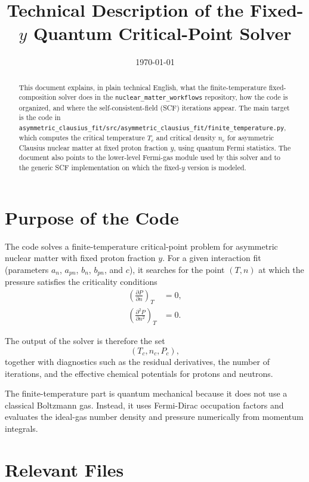 \documentclass[11pt]{article}
\title{Technical Description of the Fixed-\texorpdfstring{$y$}{y} Quantum Critical-Point Solver}
\author{}
\date{\today}
\begin{document}
\maketitle

\begin{abstract}
This document explains, in plain technical English, what the finite-temperature
fixed-composition solver does in the \texttt{nuclear\_matter\_workflows}
repository, how the code is organized, and where the self-consistent-field
(SCF) iterations appear. The main target is the code in
\texttt{asymmetric\_clausius\_fit/src/asymmetric\_clausius\_fit/finite\_temperature.py},
which computes the critical temperature $T_c$ and critical density $n_c$ for
asymmetric Clausius nuclear matter at fixed proton fraction $y$, using quantum
Fermi statistics. The document also points to the lower-level Fermi-gas module
used by this solver and to the generic SCF implementation on which the
fixed-$y$ version is modeled.
\end{abstract}

\section{Purpose of the Code}

The code solves a finite-temperature critical-point problem for asymmetric
nuclear matter with fixed proton fraction $y$. For a given interaction fit
(parameters $a_n$, $a_{pn}$, $b_n$, $b_{pn}$, and $c$), it searches for the
point $(T,n)$ at which the pressure satisfies the criticality conditions
\begin{align}
\left(\frac{\partial P}{\partial n}\right)_T &= 0, \\
\left(\frac{\partial^2 P}{\partial n^2}\right)_T &= 0.
\end{align}

The output of the solver is therefore the set
\[
(T_c, n_c, P_c),
\]
together with diagnostics such as the residual derivatives, the number of
iterations, and the effective chemical potentials for protons and neutrons.

The finite-temperature part is quantum mechanical because it does not use a
classical Boltzmann gas. Instead, it uses Fermi-Dirac occupation factors and
evaluates the ideal-gas number density and pressure numerically from momentum
integrals.

\section{Relevant Files}
\end{document}

